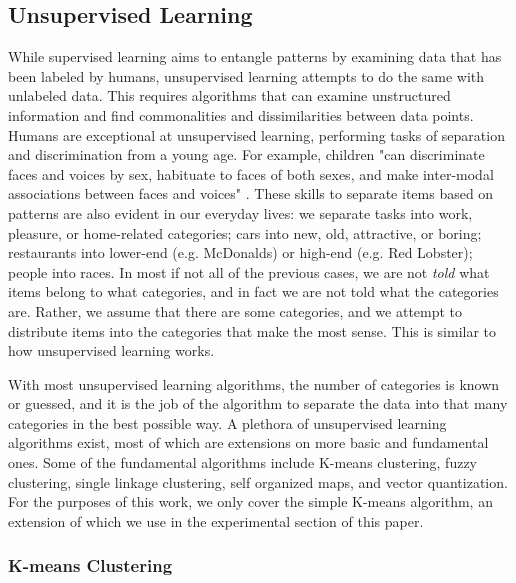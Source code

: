 \subsection{Unsupervised Learning}
While supervised learning aims to entangle patterns by examining data that has been labeled by humans, unsupervised learning attempts to do the same with unlabeled data. This requires algorithms that can examine unstructured information and find commonalities and dissimilarities between data points. Humans are exceptional at unsupervised learning, performing tasks of separation and discrimination from a young age. For example, children "can discriminate faces and voices by sex, habituate to faces of both sexes, and make inter-modal associations between faces and voices" \cite{martin2010patterns}. These skills to separate items based on patterns are also evident in our everyday lives: we separate tasks into work, pleasure, or home-related categories; cars into new, old, attractive, or boring; restaurants into lower-end (e.g. McDonalds) or high-end (e.g. Red Lobster); people into races. In most if not all of the previous cases, we are not \textit{told} what items belong to what categories, and in fact we are not told what the categories are. Rather, we assume that there are some categories, and we attempt to distribute items into the categories that make the most sense. This is similar to how unsupervised learning works.

With most unsupervised learning algorithms, the number of categories is known or guessed, and it is the job of the algorithm to separate the data into that many categories in the best possible way. A plethora of unsupervised learning algorithms exist, most of which are extensions on more basic and fundamental ones. Some of the fundamental algorithms include K-means clustering, fuzzy clustering, single linkage clustering, self organized maps, and vector quantization. For the purposes of this work, we only cover the simple K-means algorithm, an extension of which we use in the experimental section of this paper.

\subsubsection{K-means Clustering}